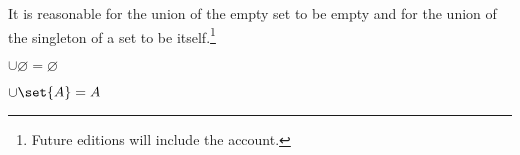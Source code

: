 It is reasonable for the union of the empty set to be empty and for the union of the singleton of a set to be itself.\footnote{Future editions will include the account.}

\begin{proposition}
$\cup \varnothing = \varnothing$
\end{proposition}

%  


\begin{proposition}
$\cup \set{A} = A$
\end{proposition}

%  


